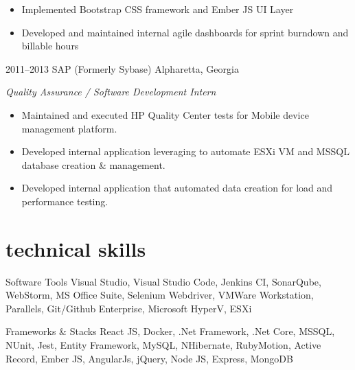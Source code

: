\documentclass[]{friggeri-cv} %
\begin{document}
\begin{entrylist}
{\begin{itemize}
    \item Implemented Bootstrap CSS framework and Ember JS UI Layer
    \item Developed and maintained internal agile dashboards for sprint burndown and billable hours
  \end{itemize}
}
\entry
{2011--2013}
{SAP (Formerly Sybase)}
{Alpharetta, Georgia}
{\raggedright
  \emph{Quality Assurance / Software Development Intern}
  \begin{itemize}
    \item Maintained and executed HP Quality Center tests for Mobile device management platform.
    \item Developed internal application leveraging to automate ESXi VM and MSSQL database creation \& management.
    \item Developed internal application that automated data creation for load and performance testing. 
  \end{itemize}
}

\end{entrylist}

\pagebreak


\section{technical skills}
\begin{entrylist}
\entry
{}
{Software Tools}
{}
{Visual Studio, Visual Studio Code, Jenkins CI, SonarQube, WebStorm, MS Office Suite, 
Selenium Webdriver, VMWare Workstation, Parallels, Git/Github Enterprise, Microsoft HyperV, ESXi}

\entry
{}
{Frameworks \& Stacks}
{}
{React JS, Docker, .Net Framework, .Net Core, MSSQL, NUnit, Jest, Entity Framework, MySQL, NHibernate, 
RubyMotion, Active Record, Ember JS, AngularJs, jQuery, Node JS, Express, MongoDB}
\end{entrylist}

\end{document}
